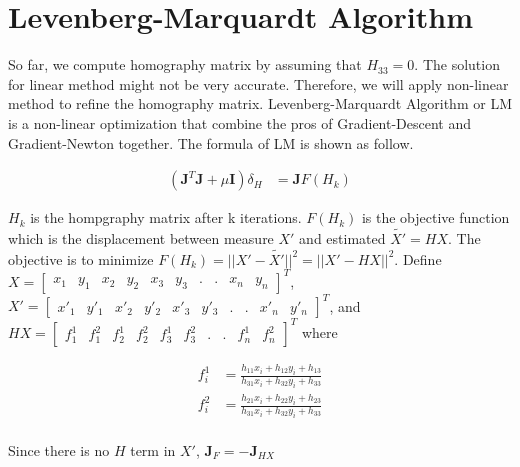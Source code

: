 \documentclass[11pt]{article}
\begin{document}

\section*{Levenberg-Marquardt Algorithm}

So far, we compute homography matrix by assuming that $H_{33} = 0$. The solution for linear method might not be very accurate. Therefore, we will apply non-linear method to refine the homography matrix. Levenberg-Marquardt Algorithm or LM is a non-linear optimization that combine the pros of Gradient-Descent and Gradient-Newton together. The formula of LM is shown as follow.

\begin{align*}
(\mathbf{J}^T \mathbf{J} + \mu \mathbf{I})\delta_H &= \mathbf{J} F(H_k)
\end{align*}

$H_k$ is the hompgraphy matrix after k iterations. $F(H_k)$ is the objective function which is the displacement between measure $X'$ and estimated $\tilde{X'} = HX$. The objective is to minimize $F(H_k) = ||X' - \tilde{X'}||^2 =||X' -  HX||^2$. Define $X = \begin{bmatrix} x_1 & y_1 & x_2 & y_2 & x_3 & y_3  & . &  . & x_n & y_n \end{bmatrix}^T$, $X' = \begin{bmatrix} x'_1 & y'_1 & x'_2 & y'_2 & x'_3 & y'_3  & . &  . & x'_n & y'_n \end{bmatrix}^T$, and $HX = \begin{bmatrix} f^1_1 & f^2_1 & f^1_2 & f^2_2 & f^1_3 & f^2_3  & . &  . & f^1_n & f^2_n \end{bmatrix}^T$ where 

\begin{align*}
f^1_i &= \frac{h_{11}x_i + h_{12}y_i + h_{13}}{h_{31}x_i + h_{32}y_i + h_{33}} \\
f^2_i &= \frac{h_{21}x_i + h_{22}y_i + h_{23}}{h_{31}x_i + h_{32}y_i + h_{33}} \\
\end{align*}

Since there is no $H$ term in $X'$, $\mathbf{J}_F = - \mathbf{J}_{HX}$
\end{document}
